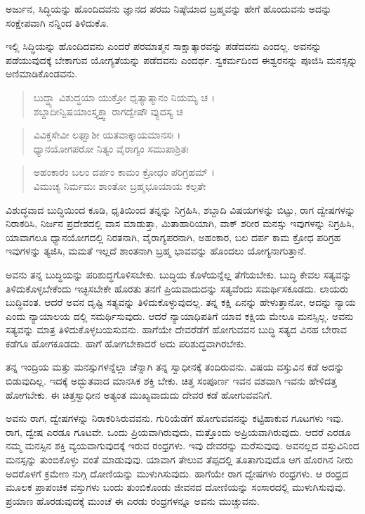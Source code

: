 {\small ಅರ್ಜುನ, ಸಿದ್ಧಿಯನ್ನು ಹೊಂದಿದವನು ಜ್ಞಾನದ ಪರಮ ನಿಷ್ಠೆಯಾದ ಬ್ರಹ್ಮವನ್ನು ಹೇಗೆ ಹೊಂದುವನು ಅದನ್ನು ಸಂಕ್ಷೇಪವಾಗಿ ನನ್ನಿಂದ ತಿಳಿದುಕೊ.}

ಇಲ್ಲಿ ಸಿದ್ಧಿಯನ್ನು ಹೊಂದಿದವನು ಎಂದರೆ ಪರಮಾತ್ಮನ ಸಾಕ್ಷಾತ್ಕಾರವನ್ನು ಪಡೆದವನು ಎಂದಲ್ಲ. ಅವನನ್ನು ಪಡೆಯುವುದಕ್ಕೆ ಬೇಕಾಗುವ ಯೋಗ್ಯತೆಯನ್ನು ಪಡೆದವನು ಎಂದರ್ಥ. ಸ್ವಕರ್ಮದಿಂದ ಈಶ್ವರನನ್ನು ಪೂಜಿಸಿ ಮನಸ್ಸನ್ನು ಅಣಿಮಾಡಿಕೊಂಡವನು.

\begin{verse}
ಬುದ್ಧ್ಯಾ ವಿಶುದ್ಧಯಾ ಯುಕ್ತೋ ಧೃತ್ಯಾತ್ಮಾನಂ ನಿಯಮ್ಯ ಚ । \\ಶಬ್ದಾದೀನ್ವಿಷಯಾಂಸ್ತ್ಯಕ್ತ್ವಾ ರಾಗದ್ವೇಷೌ ವ್ಯುದಸ್ಯ ಚ 
\end{verse}

\begin{verse}
ವಿವಿಕ್ತಸೇವೀ ಲಘ್ವಾಶೀ ಯತವಾಕ್ಕಾಯಮಾನಸಃ ।\\ಧ್ಯಾನಯೋಗಪರೋ ನಿತ್ಯಂ ವೈರಾಗ್ಯಂ ಸಮುಪಾಶ್ರಿತಃ 
\end{verse}

\begin{verse}
ಅಹಂಕಾರಂ ಬಲಂ ದರ್ಪಂ ಕಾಮಂ ಕ್ರೋಧಂ ಪರಿಗ್ರಹಮ್ ।\\ವಿಮುಚ್ಯ ನಿರ್ಮಮಃ ಶಾಂತೋ ಬ್ರಹ್ಮಭೂಯಾಯ ಕಲ್ಪತೇ 
\end{verse}

{\small ವಿಶುದ್ಧವಾದ ಬುದ್ಧಿಯಿಂದ ಕೂಡಿ, ಧೃತಿಯಿಂದ ತನ್ನನ್ನು ನಿಗ್ರಹಿಸಿ, ಶಬ್ದಾದಿ ವಿಷಯಗಳನ್ನು ಬಿಟ್ಟು, ರಾಗ ದ್ವೇಷಗಳನ್ನು ನಿರಾಕರಿಸಿ, ನಿರ್ಜನ ಪ್ರದೇಶದಲ್ಲಿ ವಾಸ ಮಾಡುತ್ತಾ, ಮಿತಾಹಾರಿಯಾಗಿ, ವಾಕ್ ಶರೀರ ಮನಸ್ಸು ಇವುಗಳನ್ನು ನಿಗ್ರಹಿಸಿ, ಯಾವಾಗಲೂ ಧ್ಯಾನಯೋಗದಲ್ಲಿ ನಿರತನಾಗಿ, ವೈರಾಗ್ಯಪರನಾಗಿ, ಅಹಂಕಾರ, ಬಲ ದರ್ಪ ಕಾಮ ಕ್ರೋಧ ಪರಿಗ್ರಹ ಇವುಗಳನ್ನು ತ್ಯಜಿಸಿ, ಮಮತೆ ಇಲ್ಲದೆ ಶಾಂತನಾಗಿ ಬ್ರಹ್ಮ ಭಾವವನ್ನು ಹೊಂದಲು ಯೋಗ್ಯನಾಗುತ್ತಾನೆ.}

ಅವನು ತನ್ನ ಬುದ್ಧಿಯನ್ನು ಪರಿಶುದ್ಧಗೊಳಿಸಬೇಕು. ಬುದ್ಧಿಯ ಕೊಳೆಯನ್ನೆಲ್ಲ ತೆಗೆಯಬೇಕು. ಬುದ್ಧಿ ಕೇವಲ ಸತ್ಯವನ್ನು ತಿಳಿದುಕೊಳ್ಳಬೇಕೆಂದು ಇಚ್ಛಿಸಬೇಕೇ ಹೊರತು ತನಗೆ ಪ್ರಿಯವಾದುದನ್ನು ಸತ್ಯವೆಂದು ಸಮರ್ಥಿಸಕೂಡದು. ಲಾಯರು ಬುದ್ಧಿವಂತ. ಆದರೆ ಅವನ ದೃಷ್ಟಿ ಸತ್ಯವನ್ನು ತಿಳಿದುಕೊಳ್ಳುವುದಲ್ಲ. ತನ್ನ ಕಕ್ಷಿ ಏನನ್ನು ಹೇಳುತ್ತಾನೋ, ಅದನ್ನು ನ್ಯಾಯ ಎಂದು ನ್ಯಾಯಾಲಯ ದಲ್ಲಿ ಸಮರ್ಥಿಸುವುದು. ಆದರೆ ನ್ಯಾಯಾಧಿಪತಿಗೆ ಯಾವ ಕಕ್ಷಿಯ ಮೇಲೂ ಮನಸ್ಸಿಲ್ಲ. ಅವನು ಸತ್ಯವನ್ನು ಮಾತ್ರ ತಿಳಿದುಕೊಳ್ಳಬಯಸುವನು. ಹಾಗೆಯೇ ದೇವರೆಡೆಗೆ ಹೋಗುವವನ ಬುದ್ಧಿ ಸತ್ಯದ ವಿನಹ ಬೇರಾವ ಕಡೆಗೂ ಹೋಗಕೂಡದು. ಹಾಗೆ ಹೋಗಬೇಕಾದರೆ ಅದು ಪರಿಶುದ್ಧವಾಗಿರಬೇಕು.

ತನ್ನ ಇಂದ್ರಿಯ ಮತ್ತು ಮನಸ್ಸುಗಳನ್ನೆಲ್ಲಾ ಚೆನ್ನಾಗಿ ತನ್ನ ಸ್ವಾಧೀನಕ್ಕೆ ತಂದಿರುವನು. ವಿಷಯ ವಸ್ತುವಿನ ಕಡೆ ಅದನ್ನು ಬಿಡುವುದಿಲ್ಲ. ಇದಕ್ಕೆ ಅದ್ಭುತವಾದ ಮಾನಸಿಕ ಶಕ್ತಿ ಬೇಕು. ಚಿತ್ತ ಸಂಪೂರ್ಣ ಇವನ ವಶವಾಗಿ ಇವನು ಹೇಳಿದತ್ತ ಹೋಗಬೇಕು. ಈ ಚಿತ್ತಸ್ವಾಧೀನ ಅತ್ಯಂತ ಮುಖ್ಯವಾದುದು ದೇವರ ಕಡೆ ಹೋಗುವವನಿಗೆ.

ಅವನು ರಾಗ, ದ್ವೇಷಗಳನ್ನು ನಿರಾಕರಿಸಿರುವವನು. ಗುರಿಯೆಡೆಗೆ ಹೋಗುವವನನ್ನು ಕಟ್ಟಿಹಾಕುವ ಗೂಟಗಳು ಇವು. ರಾಗ, ದ್ವೇಷ ಎರಡೂ ಗೂಟವೇ. ಒಂದು ಪ್ರಿಯವಾಗಿರುವುದು, ಮತ್ತೊಂದು ಅಪ್ರಿಯವಾಗಿರುವುದು. ಆದರೆ ಎರಡೂ ನಮ್ಮ ಮನಸ್ಸಿನ ಶಕ್ತಿ ವ್ಯಯವಾಗುವುದಕ್ಕೆ ಇರುವ ರಂಧ್ರಗಳು. ಇವು ದೇವರನ್ನು ಮರೆಸುವುವು. ಅವನಲ್ಲದ ವಸ್ತುವಿನಿಂದ ಮನಸ್ಸನ್ನು ತುಂಬಿಕೊಳ್ಳು ವಂತೆ ಮಾಡುವುವು. ಯಾವಾಗ ತೇಲುವ ತೆಪ್ಪದಲ್ಲಿ ತೂತಾಗುವುದೊ ಆಗ ಹೊರಗಿನ ನೀರು ಅದರೊಳಗೆ ಕ್ರಮೇಣ ನುಗ್ಗಿ ದೋಣಿಯನ್ನು ಮುಳುಗಿಸುವುದು. ಹಾಗೆಯೇ ರಾಗ ದ್ವೇಷಗಳು ರಂಧ್ರಗಳು. ಆ ರಂಧ್ರದ ಮೂಲಕ ಪ್ರಾಪಂಚಿಕ ವಸ್ತುಗಳು ಬಂದು ತುಂಬಿಕೊಂಡು ಜೀವನದ ದೋಣಿಯನ್ನು ಸಂಸಾರದಲ್ಲಿ ಮುಳುಗಿಸುವುವು. ಪ್ರಯಾಣ ಹೊರಡುವುದಕ್ಕೆ ಮುಂಚೆ ಈ ಎರಡು ರಂಧ್ರಗಳನ್ನೂ ಅವನು ಮುಚ್ಚುವನು.

